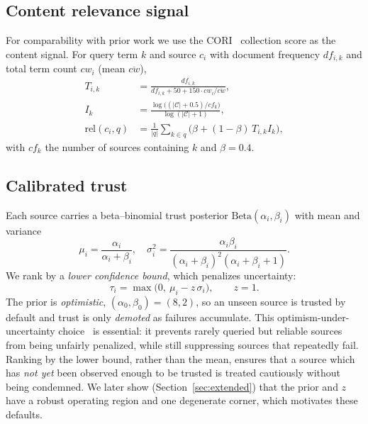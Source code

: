 \documentclass[preprint,12pt]{elsarticle}
\newcommand{\rel}{\mathrm{rel}}
\begin{document}
\subsection{Content relevance signal}
For comparability with prior work we use the CORI~\cite{callan1995cori}
collection score as the content signal. For query term $k$ and source $c_i$ with
document frequency $df_{i,k}$ and total term count $cw_i$ (mean $\overline{cw}$),
\begin{align}
T_{i,k} &= \frac{df_{i,k}}{df_{i,k} + 50 + 150\cdot cw_i/\overline{cw}}, \\
I_{k} &= \frac{\log\big((|\mathcal{C}|+0.5)/cf_k\big)}{\log(|\mathcal{C}|+1)}, \\
\rel(c_i,q) &= \frac{1}{|q|}\sum_{k\in q}\Big(\beta + (1-\beta)\,T_{i,k} I_k\Big),
\end{align}
with $cf_k$ the number of sources containing $k$ and $\beta=0.4$.

\subsection{Calibrated trust}
Each source carries a beta--binomial trust posterior
$\mathrm{Beta}(\alpha_i,\beta_i)$ with mean and variance
\begin{equation}
\mu_i=\frac{\alpha_i}{\alpha_i+\beta_i},\quad
\sigma_i^2=\frac{\alpha_i\beta_i}{(\alpha_i+\beta_i)^2(\alpha_i+\beta_i+1)} .
\end{equation}
We rank by a \emph{lower confidence bound}, which penalizes uncertainty:
\begin{equation}
\tau_i=\max\!\big(0,\ \mu_i - z\,\sigma_i\big),\qquad z=1 .
\end{equation}
The prior is \emph{optimistic}, $(\alpha_0,\beta_0)=(8,2)$, so an unseen source is
trusted by default and trust is only \emph{demoted} as failures accumulate. This
optimism-under-uncertainty choice~\cite{auer2002finite} is essential: it prevents
rarely queried but reliable sources from being unfairly penalized, while still
suppressing sources that repeatedly fail. Ranking by the lower bound, rather than
the mean, ensures that a source which has \emph{not yet} been observed enough to
be trusted is treated cautiously without being condemned. We later show
(Section~\ref{sec:extended}) that the prior and $z$ have a robust operating region
and one degenerate corner, which motivates these defaults.
\end{document}
